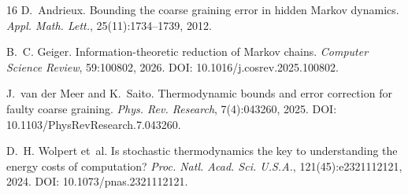 \documentclass[11pt,a4paper]{article}
\theoremstyle{definition}
\theoremstyle{remark}
\begin{document}
\begin{thebibliography}{16}
D.~Andrieux.
Bounding the coarse graining error in hidden Markov dynamics.
\emph{Appl. Math. Lett.}, 25(11):1734--1739, 2012.

B.~C. Geiger.
Information-theoretic reduction of Markov chains.
\emph{Computer Science Review}, 59:100802, 2026.
\newblock DOI: 10.1016/j.cosrev.2025.100802.

J.~van der Meer and K.~Saito.
Thermodynamic bounds and error correction for faulty coarse graining.
\emph{Phys. Rev. Research}, 7(4):043260, 2025.
\newblock DOI: 10.1103/PhysRevResearch.7.043260.

D.~H. Wolpert et~al.
Is stochastic thermodynamics the key to understanding the energy costs of computation?
\emph{Proc. Natl. Acad. Sci. U.S.A.}, 121(45):e2321112121, 2024.
\newblock DOI: 10.1073/pnas.2321112121.

\end{thebibliography}
\end{document}
